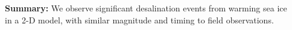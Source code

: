 \documentclass[landscape,24pt, a0paper,colspace=10mm,blockverticalspace=12mm]{tikzposter}
\begin{document}
\begin{columns}
{\begin{tcolorbox}
\vspace{0.1em}
\LARGE \textbf{Summary:} {\Large We observe significant desalination events from warming sea ice in a 2-D model, with similar magnitude and timing to field observations.}
\end{tcolorbox}

\vspace{-0.9em} } 

\begin{subcolumns}  



{

}
\end{subcolumns}
\end{columns}
\end{document}
